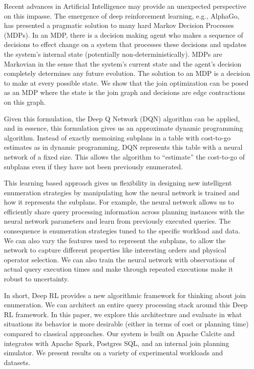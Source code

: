 Recent advances in Artificial Intelligence may provide an unexpected perspective on this impasse.
The emergence of deep reinforcement learning, e.g., AlphaGo, has presented a pragmatic solution to many hard Markov Decision Processes (MDPs).
In an MDP, there is a decision making agent who makes a sequence of decisions to effect change on a system that processes these decisions and updates the system's internal state (potentially non-deterministically). 
MDPs are Markovian in the sense that the system's current state and the agent's decision completely determines any future evolution.
The solution to an MDP is a decision to make at every possible state.
We show that the join optimization can be posed as an MDP where the state is the join graph and decisions are edge contractions on this graph.

Given this formulation, the Deep Q Network (DQN) algorithm can be applied, and in essence, this formulation gives us an approximate dynamic programming algorithm.
Instead of exactly memoizing subplans in a table with cost-to-go estimates as in dynamic programming, DQN represents this table with a neural network of a fixed size.
This allows the algorithm to ``estimate'' the cost-to-go of subplans even if they have not been previously enumerated.

This learning based approach gives us flexibility in designing new intelligent enumeration strategies by manipulating how the neural network is trained and how it represents the subplans.
For example, the neural network allows us to efficiently share query processing information across planning instances with the neural network parameters and learn from previously executed queries.
The consequence is enumeration strategies tuned to the specific workload and data.
We can also vary the features used to represent the subplans, to allow the network to capture different properties like interesting orders and physical operator selection.
We can also train the neural network with observations of actual query execution times and make through repeated executions make it robust to uncertainty.

In short, Deep RL provides a new algorithmic framework for thinking about join enumeration. 
We can architect an entire query processing stack around this Deep RL framework.
In this paper, we explore this architecture and evaluate in what situations its behavior is more desirable (either in terms of cost or planning time) compared to classical approaches.
Our system is built on Apache Calcite and integrates with Apache Spark, Postgres SQL, and an internal join planning simulator.
We present results on a variety of experimental workloads and datasets.


